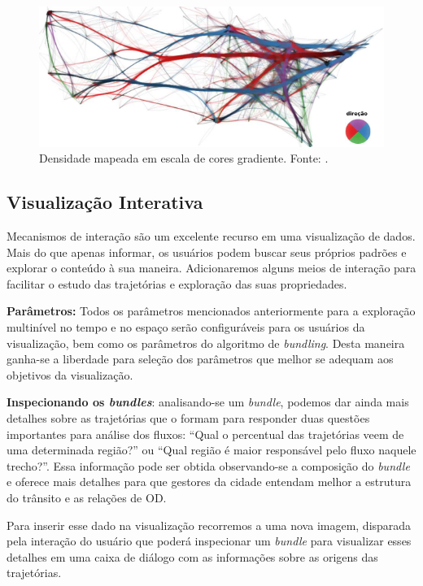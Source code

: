 \begin{figure}[ht!]
  \centering
  \includegraphics[width=\textwidth]{../figuras/color-wheel.pdf}
  \caption{Densidade mapeada em escala de cores gradiente. Fonte: \citet{Lhuillier2017}. \label{fig:direction}}
\end{figure}



\subsection{Visualização Interativa}

Mecanismos de interação são um excelente recurso em uma visualização de dados.
Mais do que apenas informar, os usuários podem buscar seus próprios padrões e
explorar o conteúdo à sua maneira. Adicionaremos alguns meios de interação para
facilitar o estudo das trajetórias e exploração das suas propriedades.

\textbf{Parâmetros:} Todos os parâmetros mencionados anteriormente para a exploração
multinível no tempo e no espaço serão configuráveis para os usuários da visualização,
bem como os parâmetros do algoritmo de \emph{bundling}. Desta maneira ganha-se
a liberdade para seleção dos parâmetros que melhor se adequam aos objetivos
da visualização.

\textbf{Inspecionando os \emph{bundles}}: analisando-se um \emph{bundle},
podemos dar ainda mais detalhes sobre as trajetórias que o formam para
responder duas questões importantes para análise dos fluxos: ``Qual o percentual
das trajetórias veem de uma determinada região?'' ou ``Qual região é maior
responsável pelo fluxo naquele trecho?''.  Essa informação pode ser obtida
observando-se a composição do \emph{bundle} e oferece mais detalhes para que
gestores da cidade entendam melhor a estrutura do trânsito e as relações de OD.

 Para inserir esse dado na visualização recorremos a uma nova
imagem, disparada pela interação do usuário que poderá inspecionar um
\emph{bundle} para visualizar esses detalhes em uma caixa de diálogo com as
informações sobre as origens das trajetórias.

